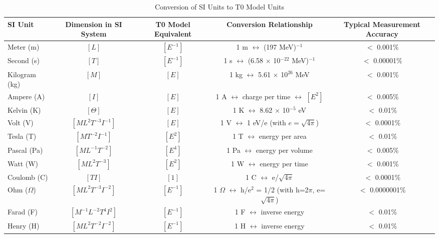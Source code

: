 \documentclass[12pt,a4paper]{article}
\begin{document}
	\begin{table}[H]
		\centering
		\begin{adjustbox}{width=\textwidth}
			\begin{tabular}{lcccc}
				\toprule
				\textbf{SI Unit} & \textbf{Dimension in SI System} & \textbf{T0 Model Equivalent} & \textbf{Conversion Relationship} & \textbf{Typical Measurement Accuracy} \\
				\midrule
				Meter (m) & $[L]$ & $[E^{-1}]$ & 1 m $\leftrightarrow$ (197 MeV)$^{-1}$ & $<$ 0.001\% \\
				Second (s) & $[T]$ & $[E^{-1}]$ & 1 s $\leftrightarrow$ (6.58 $\times$ 10$^{-22}$ MeV)$^{-1}$ & $<$ 0.00001\% \\
				Kilogram (kg) & $[M]$ & $[E]$ & 1 kg $\leftrightarrow$ 5.61 $\times$ 10$^{26}$ MeV & $<$ 0.001\% \\
				Ampere (A) & $[I]$ & $[E]$ & 1 A $\leftrightarrow$ charge per time $\leftrightarrow$ $[E^2]$ & $<$ 0.005\% \\
				Kelvin (K) & $[\Theta]$ & $[E]$ & 1 K $\leftrightarrow$ 8.62 $\times$ 10$^{-5}$ eV & $<$ 0.01\% \\
				Volt (V) & $[ML^2T^{-3}I^{-1}]$ & $[E]$ & 1 V $\leftrightarrow$ 1 eV/e (with $e = \sqrt{4\pi}$) & $<$ 0.0001\% \\
				Tesla (T) & $[MT^{-2}I^{-1}]$ & $[E^2]$ & 1 T $\leftrightarrow$ energy per area & $<$ 0.01\% \\
				Pascal (Pa) & $[ML^{-1}T^{-2}]$ & $[E^4]$ & 1 Pa $\leftrightarrow$ energy per volume & $<$ 0.005\% \\
				Watt (W) & $[ML^2T^{-3}]$ & $[E^2]$ & 1 W $\leftrightarrow$ energy per time & $<$ 0.001\% \\
				Coulomb (C) & $[TI]$ & $[1]$ & 1 C $\leftrightarrow$ e/$\sqrt{4\pi}$ & $<$ 0.0001\% \\
				Ohm ($\Omega$) & $[ML^2T^{-3}I^{-2}]$ & $[E^{-1}]$ & 1 $\Omega$ $\leftrightarrow$ h/e$^2$ = 1/2 (with h=2$\pi$, e=$\sqrt{4\pi}$) & $<$ 0.0000001\% \\
				Farad (F) & $[M^{-1}L^{-2}T^4I^2]$ & $[E^{-1}]$ & 1 F $\leftrightarrow$ inverse energy & $<$ 0.01\% \\
				Henry (H) & $[ML^2T^{-2}I^{-2}]$ & $[E^{-1}]$ & 1 H $\leftrightarrow$ inverse energy & $<$ 0.01\% \\
				\bottomrule
			\end{tabular}
		\end{adjustbox}
		\caption{Conversion of SI Units to T0 Model Units}
		\label{tab:conversion}
	\end{table}
	
\end{document}
